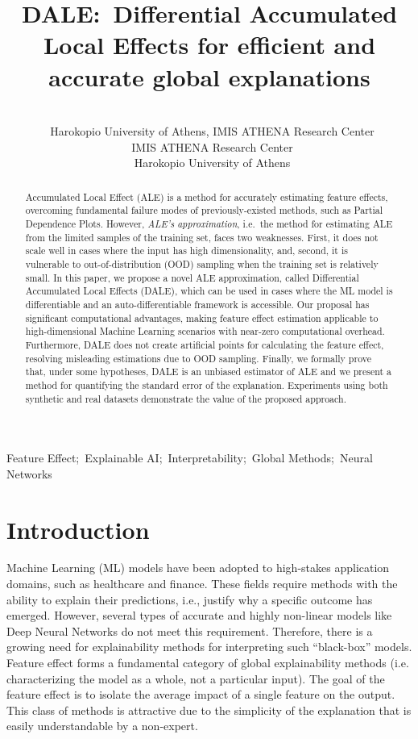 \documentclass[wcp]{jmlr}
\title[DALE:~Differential Accumulated Local Effects]{DALE:~Differential Accumulated Local Effects for efficient and accurate global explanations}
\author{\Name{Vasilis Gkolemis} \Email{gkolemis@hua.gr, vgkolemis@athenarc.gr}\\
  \addr~Harokopio University of Athens, IMIS ATHENA Research Center
  \AND
  \Name{Theodore Dalamagas} \Email{dalamag@athenarc.gr}\\
  \addr~IMIS ATHENA Research Center
  \AND
  \Name{Christos Diou} \Email{cdiou@hua.gr}\\
  \addr~Harokopio University of Athens
}
\begin{document}
\maketitle

\begin{abstract}
Accumulated Local Effect (ALE) is a method for accurately estimating feature effects, overcoming fundamental failure modes of previously-existed methods, such as Partial Dependence Plots. However, \textit{ALE's approximation}, i.e.~the method for estimating ALE from the limited samples of the training set, faces two weaknesses. First, it does not scale well in cases where the input has high dimensionality, and, second, it is vulnerable to out-of-distribution (OOD) sampling when the training set is relatively small. In this paper, we propose a novel ALE approximation, called Differential Accumulated Local Effects (DALE), which can be used in cases where the ML model is differentiable and an auto-differentiable framework is accessible. Our proposal has significant computational advantages, making feature effect estimation applicable to high-dimensional Machine Learning scenarios with near-zero computational overhead. Furthermore, DALE does not create artificial points for calculating the feature effect, resolving misleading estimations due to OOD sampling. Finally, we formally prove that, under some hypotheses, DALE is an unbiased estimator of ALE and we present a method for quantifying the standard error of the explanation. Experiments using both synthetic and real datasets demonstrate the value of the proposed approach.
\end{abstract}
\begin{keywords}
Feature Effect;~Explainable AI;~Interpretability;~Global Methods;~Neural Networks
\end{keywords}

\section{Introduction}
\label{sec:1-introduction}

Machine Learning (ML) models have been adopted to high-stakes application domains, such as healthcare and finance. These fields require methods with the ability to explain their predictions, i.e., justify why a specific outcome has emerged. However, several types of accurate and highly non-linear models like Deep Neural Networks do not meet this requirement. Therefore, there is a growing need for explainability methods for interpreting such ``black-box'' models. Feature effect forms a fundamental category of global explainability methods (i.e. characterizing the model as a whole, not a particular input). The goal of the feature effect is to isolate the average impact of a single feature on the output. This class of methods is attractive due to the simplicity of the explanation that is easily understandable by a non-expert.
\end{document}

